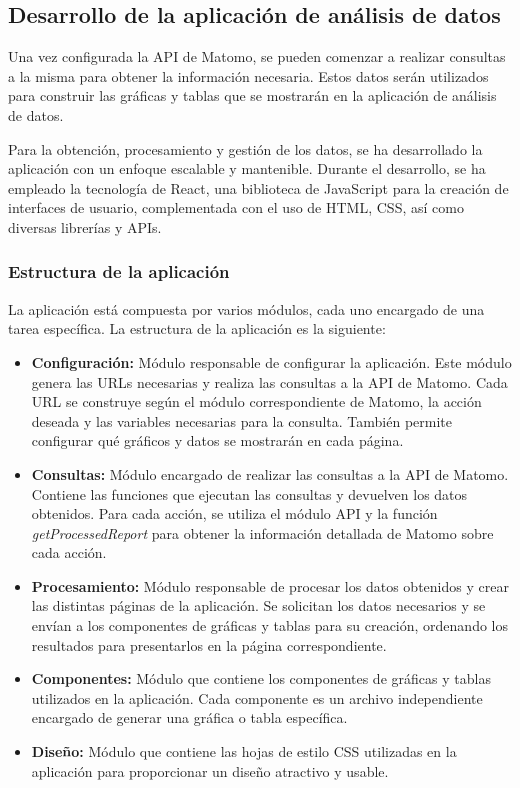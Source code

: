\subsection{Desarrollo de la aplicación de análisis de datos}
\label{sec:desarrollo-matomo}

Una vez configurada la API de Matomo, se pueden comenzar a realizar consultas a la misma para obtener la información necesaria. 
Estos datos serán utilizados para construir las gráficas y tablas que se mostrarán en la aplicación de análisis de datos.

Para la obtención, procesamiento y gestión de los datos, se ha desarrollado la aplicación con un enfoque escalable y mantenible. 
Durante el desarrollo, se ha empleado la tecnología de React, una biblioteca de JavaScript para la creación de interfaces de usuario, 
complementada con el uso de HTML, CSS, así como diversas librerías y APIs.


\subsubsection{Estructura de la aplicación}
\label{sec:estructura-aplicacion}
La aplicación está compuesta por varios módulos, cada uno encargado de una tarea específica. La estructura de la aplicación es la siguiente:

\begin{itemize}
    \item \textbf{Configuración:} Módulo responsable de configurar la aplicación. Este módulo genera las URLs necesarias y realiza las consultas a la API de Matomo. Cada URL se construye según el módulo correspondiente de Matomo, la acción deseada y las variables necesarias para la consulta. También permite configurar qué gráficos y datos se mostrarán en cada página.
    \item \textbf{Consultas:} Módulo encargado de realizar las consultas a la API de Matomo. Contiene las funciones que ejecutan las consultas y devuelven los datos obtenidos. Para cada acción, se utiliza el módulo API y la función \textit{getProcessedReport} para obtener la información detallada de Matomo sobre cada acción.
    \item \textbf{Procesamiento:} Módulo responsable de procesar los datos obtenidos y crear las distintas páginas de la aplicación. Se solicitan los datos necesarios y se envían a los componentes de gráficas y tablas para su creación, ordenando los resultados para presentarlos en la página correspondiente.
    \item \textbf{Componentes:} Módulo que contiene los componentes de gráficas y tablas utilizados en la aplicación. Cada componente es un archivo independiente encargado de generar una gráfica o tabla específica.
    \item \textbf{Diseño:} Módulo que contiene las hojas de estilo CSS utilizadas en la aplicación para proporcionar un diseño atractivo y usable.
\end{itemize}


